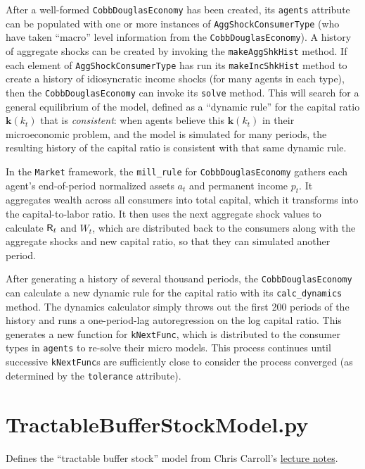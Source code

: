 \documentclass[12pt,titlepage,letterpaper]{econtex}
\begin{document}
After a well-formed \texttt{CobbDouglasEconomy} has been created, its \texttt{agents} attribute can be populated with one or more instances of \texttt{AggShockConsumerType} (who have taken ``macro'' level information from the \texttt{CobbDouglasEconomy}).  A history of aggregate shocks can be created by invoking the \texttt{makeAggShkHist} method.  If each element of \texttt{AggShockConsumerType} has run its \texttt{makeIncShkHist} method to create a history of idiosyncratic income shocks (for many agents in each type), then the \texttt{CobbDouglasEconomy} can invoke its \texttt{solve} method.  This will search for a general equilibrium of the model, defined as a ``dynamic rule'' for the capital ratio $\textbf{k}(k_t)$ that is \textit{consistent}: when agents believe this $\textbf{k}(k_t)$ in their microeconomic problem, and the model is simulated for many periods, the resulting history of the capital ratio is consistent with that same dynamic rule.

In the \texttt{Market} framework, the \texttt{mill_rule} for \texttt{CobbDouglasEconomy} gathers each agent's end-of-period normalized assets $a_t$ and permanent income $p_t$.  It aggregates wealth across all consumers into total capital, which it transforms into the capital-to-labor ratio.  It then uses the next aggregate shock values to calculate $\mathsf{R}_t$ and $W_t$, which are distributed back to the consumers along with the aggregate shocks and new capital ratio, so that they can simulated another period.

After generating a history of several thousand periods, the \texttt{CobbDouglasEconomy} can calculate a new dynamic rule for the capital ratio with its \texttt{calc_dynamics} method.  The dynamics calculator simply throws out the first 200 periods of the history and runs a one-period-lag autoregression on the log capital ratio.  This generates a new function for \texttt{kNextFunc}, which is distributed to the consumer types in \texttt{agents} to re-solve their micro models.  This process continues until successive \texttt{kNextFunc}s are sufficiently close to consider the process converged (as determined by the \texttt{tolerance} attribute).


\newpage
\section{TractableBufferStockModel.py}

Defines the ``tractable buffer stock'' model from Chris Carroll's \href{http://www.econ2.jhu.edu/people/ccarroll/public/LectureNotes/Consumption/TractableBufferStock.pdf}{lecture notes}.
\end{document}
